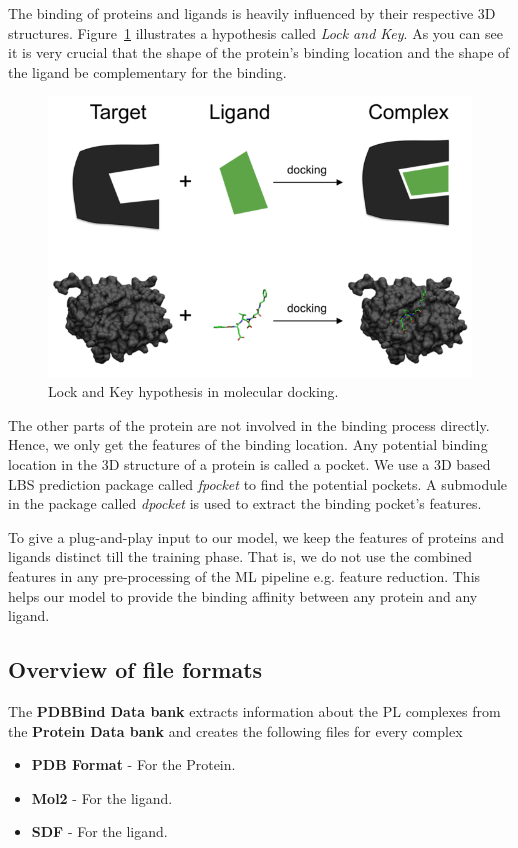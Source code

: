\documentclass[11pt]{article}
\begin{document}
The binding of proteins and ligands is heavily influenced by their respective 3D structures.
Figure~\ref{fig:lockandkey} illustrates a hypothesis called \textit{Lock and Key}.
As you can see it is very crucial that the shape of the protein's binding location and the shape of the ligand be complementary for the binding.

\begin{figure}[htb]
  \centering
    \includegraphics[scale=0.7]{images/lock_and_key}
    \caption{Lock and Key hypothesis in molecular docking.  \cite{lockandkeyformatpng}}
    \label{fig:lockandkey}
\end{figure}

The other parts of the protein are not involved in the binding process directly.
Hence,  we only get the features of the binding location.
Any potential binding location in the 3D structure of a protein is called a pocket.
We use a 3D based LBS prediction package called \textit{fpocket} to find the potential pockets.
A submodule in the package called \textit{dpocket} is used to extract the binding pocket's features.

To give a plug-and-play input to our model, we keep the features of proteins and ligands distinct till the training phase.
That is,  we do not use the combined features in any pre-processing of the ML pipeline e.g.  feature reduction.
This helps our model to provide the binding affinity between any protein and any ligand.



\subsection{Overview of file formats}
The \textbf{PDBBind Data bank} extracts information about the PL complexes from the \textbf{Protein Data bank} and creates the following files for every complex
\begin{itemize}
\item \textbf{PDB Format} - For the Protein.
\item  \textbf{Mol2} - For the ligand.
\item \textbf{SDF} - For the ligand.
\end{itemize}
\end{document}
